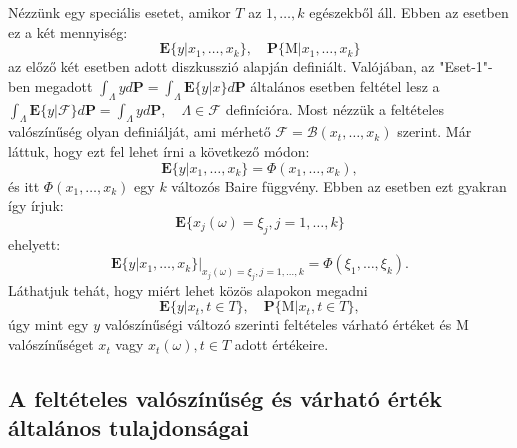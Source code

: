 \documentclass{article}
\begin{document}
Nézzünk egy speciális esetet, amikor $T$ az $1,\ldots,k$ egészekből áll. Ebben az esetben ez a két mennyiség:
\[
	\mathrm{\textbf{E}}\{y|x_1,\ldots,x_k\}, \quad \mathrm{\textbf{P}}\{ \mathrm{M} | x_1,\ldots,x_k \}
\]
az előző két esetben adott diszkusszió alapján definiált. Valójában, az "Eset-1"-ben megadott $\int_{\Lambda} y d\mathrm{\textbf{P}} = \int_{\Lambda} \mathrm{\textbf{E}}\{y|x\} d\mathrm{\textbf{P}}$ általános esetben feltétel lesz a $\int_{\Lambda} \mathrm{\textbf{E}}\{y|\mathscr{F}\} d\mathrm{\textbf{P}} = \int_{\Lambda} y d\mathrm{\textbf{P}}, \quad \Lambda \in \mathscr{F}$ definícióra. Most nézzük a feltételes valószínűség olyan definiálját, ami mérhető $\mathscr{F} = \mathscr{B}(x_t,\ldots,x_k)$ szerint. Már láttuk, hogy ezt fel lehet írni a következő módon:
\[
 \mathrm{\textbf{E}}\{y|x_1,\ldots,x_k\} = \Phi(x_1,\ldots,x_k),
\]
és itt $\Phi(x_1,\ldots,x_k)$ egy $k$ változós Baire függvény. Ebben az esetben ezt gyakran így írjuk:
\[
	\mathrm{\textbf{E}}\{ x_j(\omega) = \xi_j, j=1,\ldots,k\}
\]
ehelyett:
\[
 \mathrm{\textbf{E}}\{y|x_1,\ldots,x_k\}{|}_{x_j(\omega) = \xi_j, j=1,\ldots,k} = \Phi(\xi_1,\ldots,\xi_k).
\]
Láthatjuk tehát, hogy miért lehet közös alapokon megadni 
\[
 \mathrm{\textbf{E}}\{y|x_t, t \in T\}, \quad \mathrm{\textbf{P}}\{ \mathrm{M} | x_t, t \in T\},
\]
úgy mint egy $y$ valószínűségi változó szerinti feltételes várható értéket és $\mathrm{M}$ valószínűséget $x_t$ vagy $x_t(\omega), t \in T$ adott értékeire. 

\subsection{A feltételes valószínűség és várható érték általános tulajdonságai}
\end{document}
